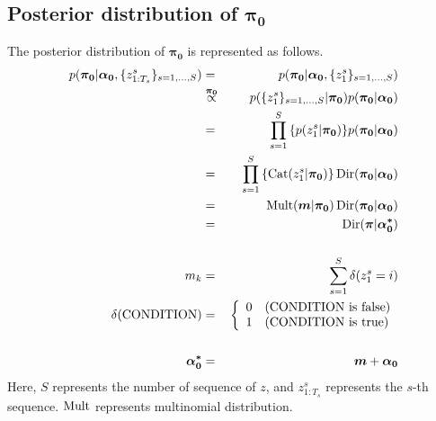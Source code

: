 \documentclass[a4paper]{article}
\DeclareMathOperator{\Cat}{\rm Cat}
\DeclareMathOperator{\Mult}{\rm Mult}
\DeclareMathOperator{\Dir}{\rm Dir}
\newcommand{\proptoas}[1]{\overset{#1}{\propto}}
\begin{document}
\subsection{Posterior distribution of $\boldsymbol{\pi_0}$}
The posterior distribution of $\boldsymbol{\pi_0}$ is represented as follows.
\begin{eqnarray}
	p(\boldsymbol{\pi_0} | \boldsymbol{\alpha_0}, \{z_{1:T_s}^{s}\}_{s=1,\ldots,S})
	&=&
	p(\boldsymbol{\pi_0} | \boldsymbol{\alpha_0}, \{z_{1}^{s}\}_{s=1,\ldots,S}) \\
	&\proptoas{\boldsymbol{\pi_0}}&
	p(\{z_{1}^{s}\}_{s=1,\ldots,S} | \boldsymbol{\pi_0}) p(\boldsymbol{\pi_0} | \boldsymbol{\alpha_0})\\
	&=&
	\prod_{s=1}^{S}{\left\{ p(z^{s}_{1} | \boldsymbol{\pi_0}) \right\} } p(\boldsymbol{\pi_0} | \boldsymbol{\alpha_0})\\
	&=&
	\prod_{s=1}^{S}{\left\{ \Cat(z^{s}_{1} | \boldsymbol{\pi_0}) \right\} } \Dir(\boldsymbol{\pi_0} | \boldsymbol{\alpha_0})\\
	&=&
	\Mult(\boldsymbol{m} | \boldsymbol{\pi_0}) \Dir(\boldsymbol{\pi_0} | \boldsymbol{\alpha_0})\\
	&=&
	\Dir(\boldsymbol{\pi} | \boldsymbol{\alpha^*_0})\\
	\nonumber \\
	m_k &=& \sum_{s=1}^{S}{\delta(z^s_1 = i)}\\
	\delta(\text{CONDITION})
	&=&
	\left\{
	\begin{array}{ll}
		0 & (\text{CONDITION is false})\\
		1 & (\text{CONDITION is true})
	\end{array}
	\right.\\
	\nonumber\\
	\boldsymbol{\alpha^*_0} &=& \boldsymbol{m} + \boldsymbol{\alpha_0}
\end{eqnarray}
Here, $S$ represents the number of sequence of $z$, and $z_{1:T_s}^{s}$ represents the $s$-th sequence.
$\Mult$ represents multinomial distribution.
\end{document}
